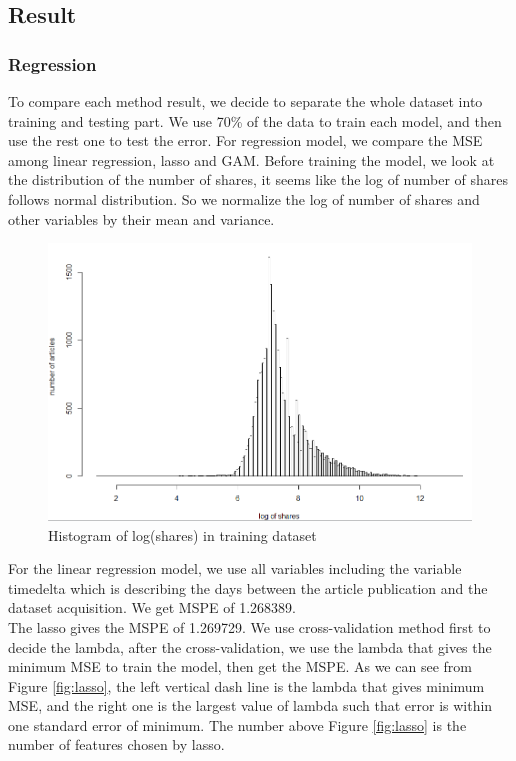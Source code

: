 \documentclass[11pt]{article}
\begin{document}
\subsection{Result}
\subsubsection{Regression}
To compare each method result, we decide to separate the whole dataset into training and testing part. We use 70\% of the data to train each model, and then use the rest one to test the error. For regression model, we compare the MSE among linear regression, lasso and GAM. Before training the model, we look at the distribution of the number of shares, it seems like the log of number of shares follows normal distribution. So we normalize the log of number of shares and other variables by their mean and variance.\\

    \begin{figure}[h]
        \centering
        \includegraphics[width=1.0\linewidth]{logy.png}
        \caption{Histogram of log(shares) in training dataset}
    \end{figure}

For the linear regression model, we use all variables including the variable timedelta which is describing the days between the article publication and the dataset acquisition. We get MSPE of 1.268389. \\

The lasso gives the MSPE of 1.269729. We use cross-validation method first to decide the lambda, after the cross-validation, we use the lambda that gives the minimum MSE to train the model, then get the MSPE. As we can see from Figure \ref{fig:lasso}, the left vertical dash line is the lambda that gives minimum MSE, and the right one is the largest value of lambda such that error is within one standard error of minimum. The number above Figure \ref{fig:lasso} is the number of features chosen by lasso. \\
\end{document}
